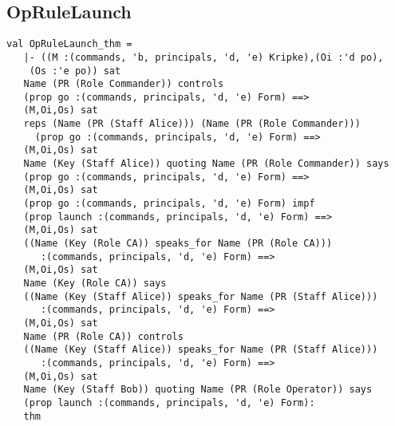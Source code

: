 \documentclass{report}
\begin{document}
\subsection{OpRuleLaunch}
\label{op-14-2}
\begin{session}
  \begin{scriptsize}
\begin{verbatim}
val OpRuleLaunch_thm =
   |- ((M :(commands, 'b, principals, 'd, 'e) Kripke),(Oi :'d po),
    (Os :'e po)) sat
   Name (PR (Role Commander)) controls
   (prop go :(commands, principals, 'd, 'e) Form) ==>
   (M,Oi,Os) sat
   reps (Name (PR (Staff Alice))) (Name (PR (Role Commander)))
     (prop go :(commands, principals, 'd, 'e) Form) ==>
   (M,Oi,Os) sat
   Name (Key (Staff Alice)) quoting Name (PR (Role Commander)) says
   (prop go :(commands, principals, 'd, 'e) Form) ==>
   (M,Oi,Os) sat
   (prop go :(commands, principals, 'd, 'e) Form) impf
   (prop launch :(commands, principals, 'd, 'e) Form) ==>
   (M,Oi,Os) sat
   ((Name (Key (Role CA)) speaks_for Name (PR (Role CA)))
      :(commands, principals, 'd, 'e) Form) ==>
   (M,Oi,Os) sat
   Name (Key (Role CA)) says
   ((Name (Key (Staff Alice)) speaks_for Name (PR (Staff Alice)))
      :(commands, principals, 'd, 'e) Form) ==>
   (M,Oi,Os) sat
   Name (PR (Role CA)) controls
   ((Name (Key (Staff Alice)) speaks_for Name (PR (Staff Alice)))
      :(commands, principals, 'd, 'e) Form) ==>
   (M,Oi,Os) sat
   Name (Key (Staff Bob)) quoting Name (PR (Role Operator)) says
   (prop launch :(commands, principals, 'd, 'e) Form):
   thm
\end{verbatim}
  \end{scriptsize}
\end{session}
\end{document}
